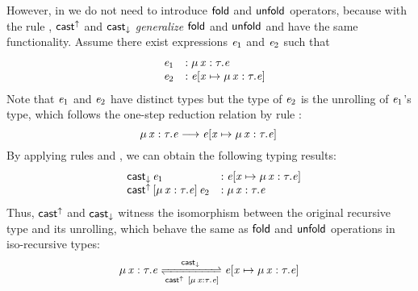 However, in \name we do not need to introduce $\mathsf{fold}$ and
$\mathsf{unfold}$ operators, because with the rule ,
$ \mathsf{cast}^{\uparrow} $ and $ \mathsf{cast}_{\downarrow} $ \emph{generalize} $\mathsf{fold}$ and
$\mathsf{unfold}$ and have the same functionality. Assume there exist
expressions $\mathit{e_{{\mathrm{1}}}}$ and $\mathit{e_{{\mathrm{2}}}}$ such that
\[\begin{array}{lll}
	&\mathit{e_{{\mathrm{1}}}} &: \mu \, \mathit{x}  :  \tau  .  \mathit{e}\\
	&\mathit{e_{{\mathrm{2}}}} &: \mathit{e}  [  \mathit{x}  \mapsto  \mu \, \mathit{x}  :  \tau  .  \mathit{e}  ] \,
\end{array}\]
Note that $\mathit{e_{{\mathrm{1}}}}$ and $\mathit{e_{{\mathrm{2}}}}$ have distinct types but the type of $\mathit{e_{{\mathrm{2}}}}$ is
the unrolling of $\mathit{e_{{\mathrm{1}}}}$'s type, which follows the one-step reduction relation
by rule :
\[ \mu \, \mathit{x}  :  \tau  .  \mathit{e}  \longrightarrow  \mathit{e}  [  \mathit{x}  \mapsto  \mu \, \mathit{x}  :  \tau  .  \mathit{e}  ] \, \]
By applying rules  and , we can obtain
the following typing results:
\[\begin{array}{lll}
	&\mathsf{cast}_{\downarrow} \, \mathit{e_{{\mathrm{1}}}} &: \mathit{e}  [  \mathit{x}  \mapsto  \mu \, \mathit{x}  :  \tau  .  \mathit{e}  ] \,\\
	&\mathsf{cast}^{\uparrow} \, [  \mu \, \mathit{x}  :  \tau  .  \mathit{e}  ] \,  \mathit{e_{{\mathrm{2}}}} &: \mu \, \mathit{x}  :  \tau  .  \mathit{e}
\end{array}\]
Thus, $ \mathsf{cast}^{\uparrow} $ and $ \mathsf{cast}_{\downarrow} $ witness the isomorphism between the
original recursive type and its unrolling, which behave the same as $\mathsf{fold}$
and $\mathsf{unfold}$ operations in iso-recursive types:
\begin{align*}
  \mu \, \ottmv{x}  \ottsym{:}  \tau  \ottsym{.}  \ottnt{e} \xrightleftharpoons[{ \kw{cast}^{\uparrow} ~[ \mu \, \ottmv{x}  \ottsym{:}  \tau  \ottsym{.}  \ottnt{e}
  ]}]{ \kw{cast}_{\downarrow} } \ottnt{e}  \ottsym{[}  \ottmv{x}  \mapsto  \mu \, \ottmv{x}  \ottsym{:}  \tau  \ottsym{.}  \ottnt{e}  \ottsym{]} \,
\end{align*}


